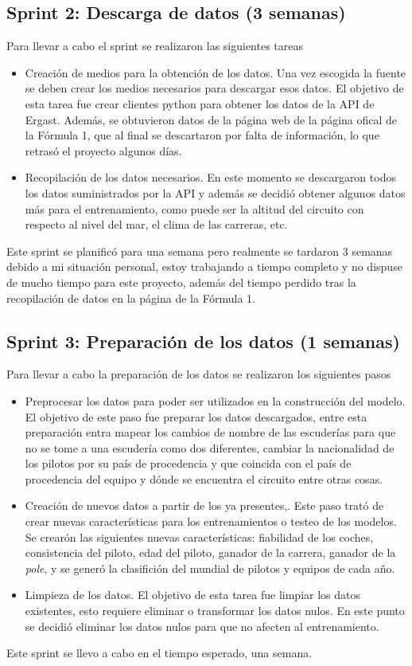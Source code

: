 \subsection{Sprint 2: Descarga de datos (3 semanas)}
Para llevar a cabo el sprint se realizaron las siguientes tareas
\begin{itemize}
    \item 
    Creación de medios para la obtención de los datos.
    Una vez escogida la fuente se deben crear los medios necesarios para descargar esos datos. El objetivo de esta tarea fue crear clientes python para obtener los datos de la API de Ergast.
    Además, se obtuvieron datos de la página web de la página ofical de la Fórmula 1, que al final se descartaron por falta de información, lo que retrasó el proyecto algunos días. 
    \item
    Recopilación de los datos necesarios.
    En este momento se descargaron todos los datos suministrados por la API y además se decidió obtener algunos datos más para el entrenamiento, como puede ser la altitud del circuito con respecto al nivel del mar, el clima de las carreras, etc.
\end{itemize}

Este sprint se planificó para una semana pero realmente se tardaron 3 semanas debido a mi situación personal, estoy trabajando a tiempo completo y no dispuse de mucho tiempo para este proyecto, además del tiempo perdido tras la recopilación de datos en la página de la Fórmula 1.

\subsection{Sprint 3: Preparación de los datos (1 semanas)}
Para llevar a cabo la preparación de los datos se realizaron los siguientes pasos
\begin{itemize}
    \item 
    Preprocesar los datos para poder ser utilizados en la construcción del modelo.
    El objetivo de este paso fue preparar los datos descargados, entre esta preparación entra mapear los cambios de nombre de las escuderías para que no se tome a una escudería como dos diferentes, cambiar la nacionalidad de los pilotos por su país de procedencia y que coincida con el país de procedencia del equipo y dónde se encuentra el circuito entre otras cosas.
    \item
    Creación de nuevos datos a partir de los ya presentes,.
    Este paso trató de crear nuevas características para los entrenamientos o testeo de los modelos. Se crearón las siguientes nuevas características: fiabilidad de los coches, consistencia del piloto, edad del piloto, ganador de la carrera, ganador de la \textit{pole}, y se generó la clasifición del mundial de pilotos y equipos de cada año.
    \item 
    Limpieza de los datos.
    El objetivo de esta tarea fue limpiar los datos existentes, esto requiere eliminar o transformar los datos nulos. En este punto se decidió eliminar los datos nulos para que no afecten al entrenamiento.
    
\end{itemize}
Este sprint se llevo a cabo en el tiempo esperado, una semana.


